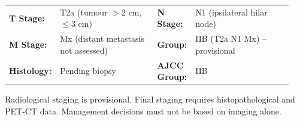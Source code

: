 \documentclass[11pt,a4paper]{article}
\begin{document}
\begin{tcolorbox}[tealbox, title={\faDna\hspace{4pt}Provisional Radiological TNM Staging (8th Ed.)}]
\vspace{4pt}
\small
\begin{tabular}{@{}p{0.12\linewidth}p{0.35\linewidth}p{0.12\linewidth}p{0.35\linewidth}@{}}
  \textbf{T Stage:} & T2a (tumour $>$2 cm, $\leq$3 cm) & \textbf{N Stage:} & N1 (ipsilateral hilar node) \\[4pt]
  \textbf{M Stage:} & Mx (distant metastasis not assessed) & \textbf{Group:} & IIB (T2a N1 Mx) -- provisional \\[4pt]
  \textbf{Histology:} & Pending biopsy & \textbf{AJCC Group:} & IIB \\
\end{tabular}
\vspace{4pt}

 Radiological staging is provisional. Final staging requires histopathological and PET-CT data. Management decisions must not be based on imaging alone.
\vspace{4pt}
\end{tcolorbox}

\vspace{6pt}
\end{document}
